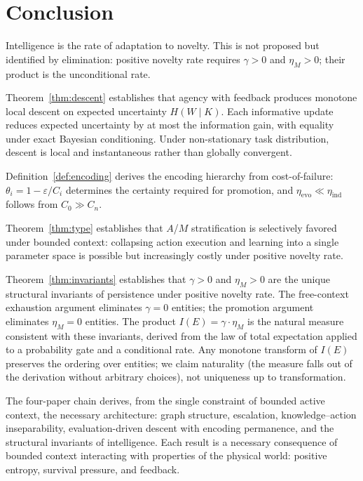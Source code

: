 \documentclass[11pt]{article}
\theoremstyle{definition}
\theoremstyle{remark}
\begin{document}
\section{Conclusion}
\label{sec:conclusion}

Intelligence is the rate of adaptation to novelty. This is not proposed
but identified by elimination: positive novelty rate requires $\gamma > 0$
and $\eta_M > 0$; their product is the unconditional rate.

Theorem~\ref{thm:descent} establishes that agency with feedback
produces monotone local descent on expected uncertainty $H(W \mid K)$.
Each informative update reduces expected uncertainty by at most the
information gain, with equality under exact Bayesian conditioning. Under
non-stationary task distribution, descent is local and instantaneous
rather than globally convergent.

Definition~\ref{def:encoding} derives the encoding hierarchy from
cost-of-failure: $\theta_i = 1 - \varepsilon / C_i$ determines the
certainty required for promotion, and $\eta_{\mathrm{evo}} \ll
\eta_{\mathrm{ind}}$ follows from $C_0 \gg C_n$.

Theorem~\ref{thm:type} establishes that $A$/$M$ stratification is
selectively favored under bounded context: collapsing action execution
and learning into a single parameter space is possible but increasingly
costly under positive novelty rate.

Theorem~\ref{thm:invariants} establishes that $\gamma > 0$ and
$\eta_M > 0$ are the unique structural invariants of persistence under
positive novelty rate. The free-context exhaustion argument eliminates
$\gamma = 0$ entities; the promotion argument eliminates $\eta_M = 0$
entities. The product $I(E) = \gamma \cdot \eta_M$ is the natural measure
consistent with these invariants, derived from the law of total
expectation applied to a probability gate and a conditional rate.
Any monotone transform of $I(E)$ preserves the ordering over entities;
we claim naturality (the measure falls out of the derivation without
arbitrary choices), not uniqueness up to transformation.

The four-paper chain derives, from the single constraint of bounded
active context, the necessary architecture: graph structure,
escalation, knowledge--action inseparability, evaluation-driven descent
with encoding permanence, and the structural invariants of intelligence.
Each result is a necessary consequence of bounded context interacting
with properties of the physical world: positive entropy, survival
pressure, and feedback.
\end{document}
